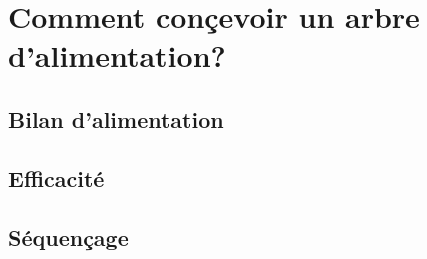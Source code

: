 
\section{Comment conçevoir un arbre d'alimentation?}

\subsection{Bilan d'alimentation}
\subsection{Efficacité}
\subsection{Séquençage}